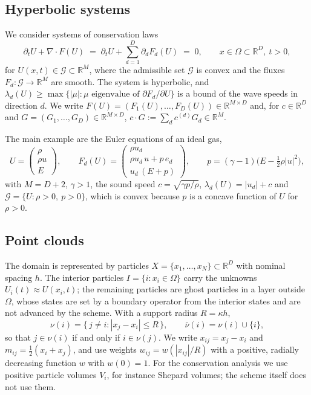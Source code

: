 \documentclass[11pt,a4paper]{article}
\theoremstyle{plain}
\theoremstyle{definition}
\theoremstyle{remark}
\numberwithin{equation}{section}
\newcommand{\R}{\mathbb{R}}
\newcommand{\nb}{\nu}
\newcommand{\cnb}{\bar\nu}
\newcommand{\Ad}{\mathcal{G}}
\begin{document}
\subsection{Hyperbolic systems}

We consider systems of conservation laws
\begin{equation}\label{eq:pde}
\partial_t U + \nabla\cdot F(U) \;=\; \partial_t U + \sum_{d=1}^{D} \partial_d F_d(U) \;=\; 0, \qquad x\in\Omega\subset\R^D,\ t>0,
\end{equation}
for $U(x,t)\in\Ad\subset\R^M$, where the admissible set $\Ad$ is convex and the fluxes $F_d\colon\Ad\to\R^M$ are smooth. The system is hyperbolic, and $\lambda_d(U)\ge \max\{|\mu| : \mu \text{ eigenvalue of } \partial F_d/\partial U\}$ is a bound of the wave speeds in direction $d$. We write $F(U)=(F_1(U),\dots,F_D(U))\in\R^{M\times D}$ and, for $c\in\R^D$ and $G=(G_1,\dots,G_D)\in\R^{M\times D}$, $c\cdot G := \sum_{d} c^{(d)} G_d\in\R^M$.

The main example are the Euler equations of an ideal gas,
\begin{equation}\label{eq:euler}
U = \begin{pmatrix}\rho\\ \rho u\\ E\end{pmatrix},\qquad
F_d(U) = \begin{pmatrix}\rho u_d\\ \rho u_d\, u + p\, e_d\\ u_d\,(E+p)\end{pmatrix},\qquad
p = (\gamma-1)\Big(E-\tfrac12\rho|u|^2\Big),
\end{equation}
with $M=D+2$, $\gamma>1$, the sound speed $c=\sqrt{\gamma p/\rho}$, $\lambda_d(U)=|u_d|+c$ and $\Ad=\{U:\rho>0,\ p>0\}$, which is convex because $p$ is a concave function of $U$ for $\rho>0$.

\subsection{Point clouds}\label{sec:cloud}

The domain is represented by particles $X=\{x_1,\dots,x_N\}\subset\R^D$ with nominal spacing $h$. The interior particles $I=\{i: x_i\in\Omega\}$ carry the unknowns $U_i(t)\approx U(x_i,t)$; the remaining particles are ghost particles in a layer outside $\Omega$, whose states are set by a boundary operator from the interior states and are not advanced by the scheme. With a support radius $R=\kappa h$,
\begin{equation}
\nb(i) = \{\, j\ne i : |x_j-x_i|\le R \,\},\qquad \cnb(i)=\nb(i)\cup\{i\},
\end{equation}
so that $j\in\nb(i)$ if and only if $i\in\nb(j)$. We write $x_{ij} = x_j - x_i$ and $m_{ij} = \tfrac12(x_i+x_j)$, and use weights $w_{ij}=w(|x_{ij}|/R)$ with a positive, radially decreasing function $w$ with $w(0)=1$. For the conservation analysis we use positive particle volumes $V_i$, for instance Shepard volumes; the scheme itself does not use them.
\end{document}
